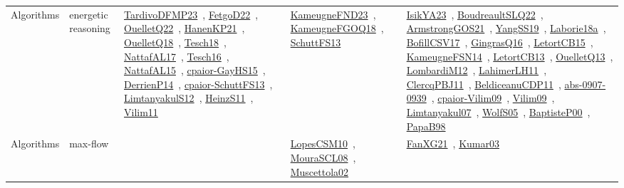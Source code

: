 {\begin{longtable}{lp{3cm}>{\raggedright\arraybackslash}p{6cm}>{\raggedright\arraybackslash}p{6cm}>{\raggedright\arraybackslash}p{8cm}}
Algorithms & energetic reasoning & \href{papers/TardivoDFMP23.pdf}{TardivoDFMP23}~\cite{TardivoDFMP23}, \href{articles/FetgoD22.pdf}{FetgoD22}~\cite{FetgoD22}, \href{papers/OuelletQ22.pdf}{OuelletQ22}~\cite{OuelletQ22}, \href{papers/HanenKP21.pdf}{HanenKP21}~\cite{HanenKP21}, \href{papers/OuelletQ18.pdf}{OuelletQ18}~\cite{OuelletQ18}, \href{papers/Tesch18.pdf}{Tesch18}~\cite{Tesch18}, \href{articles/NattafAL17.pdf}{NattafAL17}~\cite{NattafAL17}, \href{papers/Tesch16.pdf}{Tesch16}~\cite{Tesch16}, \href{articles/NattafAL15.pdf}{NattafAL15}~\cite{NattafAL15}, \href{papers/cpaior-GayHS15.pdf}{cpaior-GayHS15}~\cite{cpaior-GayHS15}, \href{papers/DerrienP14.pdf}{DerrienP14}~\cite{DerrienP14}, \href{papers/cpaior-SchuttFS13.pdf}{cpaior-SchuttFS13}~\cite{cpaior-SchuttFS13}, \href{articles/LimtanyakulS12.pdf}{LimtanyakulS12}~\cite{LimtanyakulS12}, \href{papers/HeinzS11.pdf}{HeinzS11}~\cite{HeinzS11}, \href{papers/Vilim11.pdf}{Vilim11}~\cite{Vilim11} & \href{papers/KameugneFND23.pdf}{KameugneFND23}~\cite{KameugneFND23}, \href{papers/KameugneFGOQ18.pdf}{KameugneFGOQ18}~\cite{KameugneFGOQ18}, \href{papers/SchuttFS13.pdf}{SchuttFS13}~\cite{SchuttFS13} & \href{articles/IsikYA23.pdf}{IsikYA23}~\cite{IsikYA23}, \href{papers/BoudreaultSLQ22.pdf}{BoudreaultSLQ22}~\cite{BoudreaultSLQ22}, \href{papers/ArmstrongGOS21.pdf}{ArmstrongGOS21}~\cite{ArmstrongGOS21}, \href{papers/YangSS19.pdf}{YangSS19}~\cite{YangSS19}, \href{papers/Laborie18a.pdf}{Laborie18a}~\cite{Laborie18a}, \href{papers/BofillCSV17.pdf}{BofillCSV17}~\cite{BofillCSV17}, \href{papers/GingrasQ16.pdf}{GingrasQ16}~\cite{GingrasQ16}, \href{articles/LetortCB15.pdf}{LetortCB15}~\cite{LetortCB15}, \href{articles/KameugneFSN14.pdf}{KameugneFSN14}~\cite{KameugneFSN14}, \href{papers/LetortCB13.pdf}{LetortCB13}~\cite{LetortCB13}, \href{papers/OuelletQ13.pdf}{OuelletQ13}~\cite{OuelletQ13}, \href{articles/LombardiM12.pdf}{LombardiM12}~\cite{LombardiM12}, \href{papers/LahimerLH11.pdf}{LahimerLH11}~\cite{LahimerLH11}, \href{papers/ClercqPBJ11.pdf}{ClercqPBJ11}~\cite{ClercqPBJ11}, \href{articles/BeldiceanuCDP11.pdf}{BeldiceanuCDP11}~\cite{BeldiceanuCDP11}, \href{articles/abs-0907-0939.pdf}{abs-0907-0939}~\cite{abs-0907-0939}, \href{papers/cpaior-Vilim09.pdf}{cpaior-Vilim09}~\cite{cpaior-Vilim09}, \href{papers/Vilim09.pdf}{Vilim09}~\cite{Vilim09}, \href{papers/Limtanyakul07.pdf}{Limtanyakul07}~\cite{Limtanyakul07}, \href{papers/WolfS05.pdf}{WolfS05}~\cite{WolfS05}, \href{articles/BaptisteP00.pdf}{BaptisteP00}~\cite{BaptisteP00}, \href{articles/PapaB98.pdf}{PapaB98}~\cite{PapaB98}\\
Algorithms & max-flow &  & \href{articles/LopesCSM10.pdf}{LopesCSM10}~\cite{LopesCSM10}, \href{papers/MouraSCL08.pdf}{MouraSCL08}~\cite{MouraSCL08}, \href{papers/Muscettola02.pdf}{Muscettola02}~\cite{Muscettola02} & \href{articles/FanXG21.pdf}{FanXG21}~\cite{FanXG21}, \href{papers/Kumar03.pdf}{Kumar03}~\cite{Kumar03}\\

\end{longtable}}
